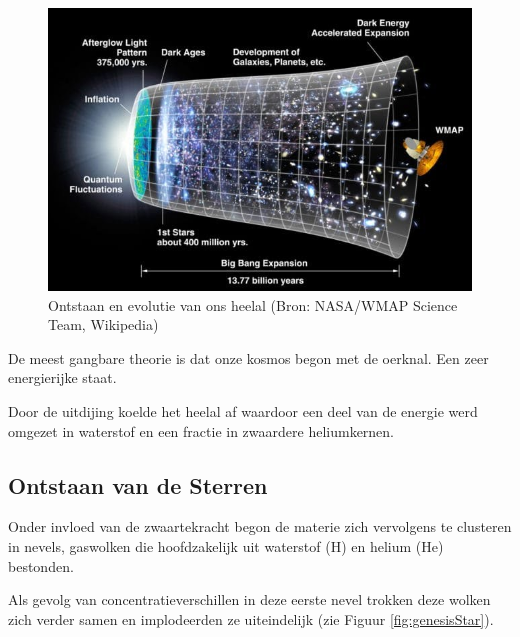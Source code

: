 \documentclass[
  11pt,
]{book}
\begin{document}
\begin{figure}

{\centering \includegraphics[width=1\linewidth]{./figs/originKosmos} 

}

\caption{Ontstaan ​​en evolutie van ons heelal (Bron: NASA/WMAP Science Team, Wikipedia)}\label{fig:evolutionUniverse}
\end{figure}

De meest gangbare theorie is dat onze kosmos begon met de oerknal. Een zeer energierijke staat.

Door de uitdijing koelde het heelal af waardoor een deel van de energie werd omgezet in waterstof en een fractie in zwaardere heliumkernen.

\hypertarget{ontstaan-van-de-sterren}{%
\subsection{Ontstaan van de Sterren}\label{ontstaan-van-de-sterren}}

Onder invloed van de zwaartekracht begon de materie zich vervolgens te clusteren in nevels, gaswolken die hoofdzakelijk uit waterstof (H) en helium (He) bestonden.

Als gevolg van concentratieverschillen in deze eerste nevel trokken deze wolken zich verder samen en implodeerden ze uiteindelijk (zie Figuur \ref{fig:genesisStar}).
\end{document}
